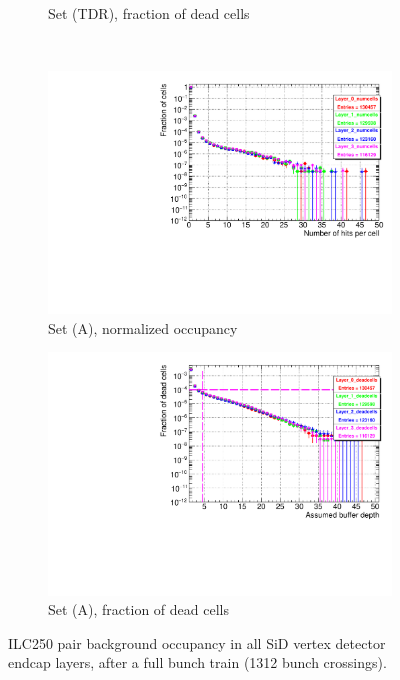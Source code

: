 \begin{figure}[!htbp]
\begin{subfigure}[b]{0.49\textwidth}
   \caption{Set (TDR), fraction of dead cells}
   \end{subfigure}\\
  \begin{subfigure}[b]{0.49\textwidth}
   \centering
    \includegraphics[width=\textwidth]{Figures/Pairs/Appendix/occupancy_numcells_SiVertexEndcap_ILC250_SetA.pdf}
   \caption{Set (A), normalized occupancy}
   \end{subfigure}
   \hfill
    \begin{subfigure}[b]{0.49\textwidth}
   \centering
    \includegraphics[width=\textwidth]{Figures/Pairs/Appendix/occupancy_deadcells_SiVertexEndcap_ILC250_SetA.pdf}
   \caption{Set (A), fraction of dead cells}
   \end{subfigure}
      \caption[Pair background occupancy in all SiD vertex detector endcap layers for the ILC250]{ILC250 pair background occupancy in all SiD vertex detector endcap layers, after a full bunch train (1312 bunch crossings).
}
\end{figure}
